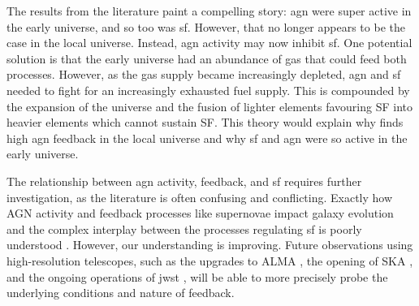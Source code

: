 The results from the literature paint a compelling story: \gls{agn} were super active in the early universe, and so too was \gls{sf}. However, that no longer appears to be the case in the local universe. Instead, \gls{agn} activity may now inhibit \gls{sf}. One potential solution is that the early universe had an abundance of gas that could feed both processes. However, as the gas supply became increasingly depleted, \gls{agn} and \gls{sf} needed to fight for an increasingly exhausted fuel supply. This is compounded by the expansion of the universe and the fusion of lighter elements favouring SF into heavier elements which cannot sustain SF. This theory would explain why \cite{katsianis_evolution_2017} finds high \gls{agn} feedback in the local universe and why \gls{sf} and \gls{agn} were so active in the early universe. 

The relationship between \gls{agn} activity, feedback, and \gls{sf} requires further investigation, as the literature is often confusing and conflicting. Exactly how AGN activity and feedback processes like supernovae impact galaxy evolution and the complex interplay between the processes regulating \gls{sf} is poorly understood \citep{grazian_galaxy_2015}. However, our understanding is improving. Future observations using high-resolution telescopes, such as the upgrades to ALMA \citep{carpenter_alma_2023}, the opening of SKA \citep{dewdney_square_2009}, and the ongoing operations of \gls{jwst} \citep{gardner_james_2006}, will be able to more precisely probe the underlying conditions and nature of feedback.